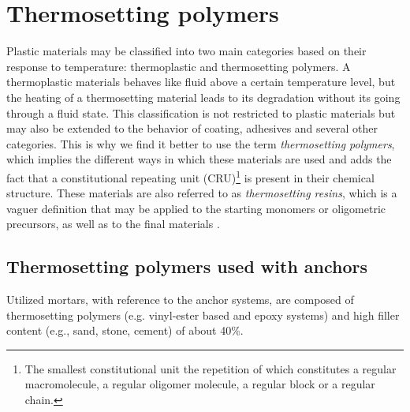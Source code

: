 \thispagestyle{plain}
\section{Thermosetting polymers}\label{sec:thermo_polymers}

Plastic materials may be classified into two main categories based on their response to temperature: thermoplastic and thermosetting polymers. A thermoplastic materials behaves like fluid above a certain temperature level, but the heating of a thermosetting material leads to its degradation without its going through a fluid state. This classification is not restricted to plastic materials but may also be extended to the behavior of coating, adhesives and several other categories. This is why we find it better to use the term \textit{thermosetting polymers}, which implies the different ways in which these materials are used and adds the fact that a constitutional repeating unit (CRU)\footnote{The smallest constitutional unit the repetition of which constitutes a regular macromolecule, a regular oligomer molecule, a regular block or a regular chain.} is present in their chemical structure. These materials are also referred to as \textit{thermosetting resins}, which is a vaguer definition that may be applied to the starting monomers or oligometric precursors, as well as to the final materials \cite{thermosetting_polymers}. 

\subsection{Thermosetting polymers used with anchors}\label{subsec:polymers_in_anchors}
Utilized mortars, with reference to the anchor systems, are composed of thermosetting polymers (e.g. vinyl-ester based and epoxy systems) and high filler content (e.g., sand, stone, cement) of about 40\%.

